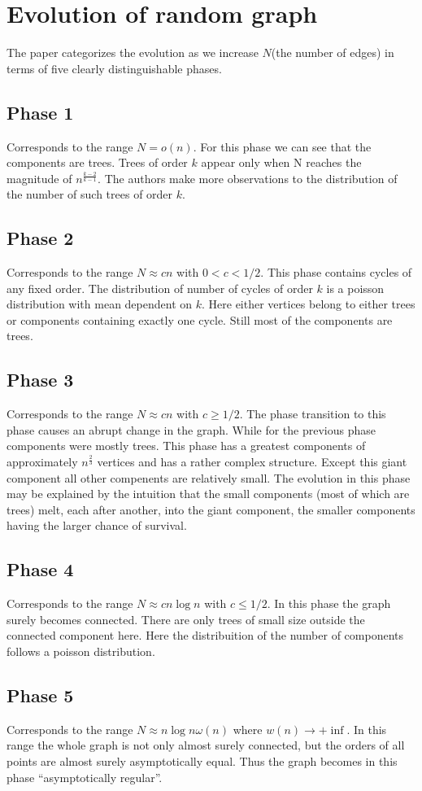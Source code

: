 \section{Evolution of random graph}
The paper categorizes the evolution as we increase $N$(the number of edges) in terms of five clearly distinguishable phases.
\subsection{Phase 1}
Corresponds to the range $N = o(n)$. For this phase we can see that the components are trees. Trees of order $k$ appear only when N reaches the magnitude of $n^{\frac{k-2}{k-1}}$. The authors make more observations to the distribution of the number of such trees of order $k$.
\subsection{Phase 2}
Corresponds to the range $N \approx cn$ with $0<c<1/2$. This phase contains cycles of any fixed order. The distribution of number of cycles of order $k$ is a poisson distribution with mean dependent on $k$. Here either vertices belong to either trees or components containing exactly one cycle. Still most of the components are trees.
\subsection{Phase 3}
Corresponds to the range $N \approx cn$ with $c \geq 1/2$. The phase transition to this phase causes an abrupt change in the graph. While for the previous phase components were mostly trees. This phase has a greatest components of approximately $n^{\frac{2}{3}}$ vertices and has a rather complex structure. Except this giant component all other compenents are relatively small. The evolution in this phase may be explained by the intuition that the small components (most of which are trees) melt, each after another, into the giant component, the smaller components having the larger chance of survival.
\subsection{Phase 4}
Corresponds to the range $N \approx cn\log n$ with $c \leq 1/2$. In this phase the graph surely becomes connected. There are only trees of small size outside the connected component here. Here the distribuition of the number of components follows a poisson distribution.
\subsection{Phase 5}
Corresponds to the range $N \approx n\log n \omega(n)$ where $w(n) \rightarrow +\inf$. In this range the whole graph is not only almost surely connected, but the orders of all points are almost surely asymptotically equal. Thus the graph becomes in this phase “asymptotically regular”.